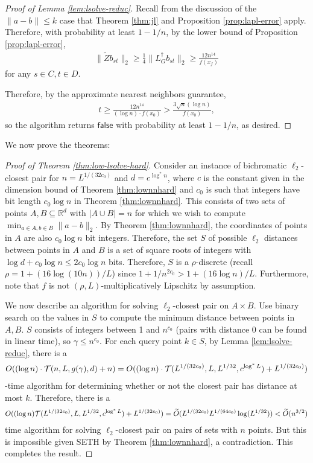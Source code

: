 \begin{proof}[Proof of Lemma \ref{lem:lsolve-reduc}]
Recall from the discussion of the $\|a - b\|\le k$ case that Theorem \ref{thm:jl} and Proposition \ref{prop:lapl-error} apply. Therefore, with probability at least $1 - 1/n$, by the lower bound of Proposition \ref{prop:lapl-error},
\begin{align*}
\|\tilde{Z}b_{st}\|_2 \ge \frac{1}{4} \| L_G^{\dagger} b_{st} \|_2 \ge \frac{12n^{14}}{f(x_f)}
\end{align*}
for any $s\in C,t\in D$. 

Therefore, by the approximate nearest neighbors guarantee, 
\begin{align*}
t \ge \frac{12 n^{14}}{ (\log n) \cdot f(x_0) } > \frac{ 3\sqrt{n} (\log n) }{ f(x_0) },
\end{align*}
so the algorithm returns $\mathsf{false}$ with probability at least $1 - 1/n$, as desired.
\end{proof}

We now prove the theorems:

\begin{proof}[Proof of Theorem \ref{thm:low-lsolve-hard}]
Consider an instance of bichromatic $\ell_2$-closest pair for $n = L^{1/(32c_0)}$ and $d = c^{\log^* n}$, where $c$ is the constant given in the dimension bound of Theorem \ref{thm:lownnhard} and $c_0$ is such that integers have bit length $c_0\log n$ in Theorem \ref{thm:lownnhard}. This consists of two sets of points $A,B\subseteq \mathbb{R}^d$ with $|A\cup B| = n$ for which we wish to compute $\min_{a\in A, b\in B} \|a - b\|_2$. By Theorem \ref{thm:lownnhard}, the coordinates of points in $A$ are also $c_0\log n$ bit integers. Therefore, the set $S$ of possible $\ell_2$ distances between points in $A$ and $B$ is a set of square roots of integers with $\log d + c_0\log n\le 2c_0\log n$ bits. Therefore, $S$ is a $\rho$-discrete (recall $\rho = 1 + (16\log (10n))/L$) since $1 + 1/n^{2c_0} > 1 + (16\log n)/L$. Furthermore, note that $f$ is not $(\rho,L)$-multiplicatively Lipschitz by assumption.

We now describe an algorithm for solving $\ell_2$-closest pair on $A\times B$. Use binary search on the values in $S$ to compute the minimum distance between points in $A,B$. $S$ consists of integers between 1 and $n^{c_0}$ (pairs with distance 0 can be found in linear time), so $\gamma \le n^{c_0}$. For each query point $k\in S$, by Lemma \ref{lem:lsolve-reduc}, there is a 
\begin{align*}
O((\log n)\cdot \mathcal{T}(n,L,g(\gamma),d) + n) = O((\log n) \cdot \mathcal{T}(L^{1/(32c_0)},L,L^{1/32},c^{\log^* L}) + L^{1/(32c_0)})
\end{align*}
-time algorithm for determining whether or not the closest pair has distance at most $k$. Therefore, there is a 
\begin{align*}
O((\log n) \mathcal{T}(L^{1/(32c_0)},L,L^{1/32},c^{\log^* L}) + L^{1/(32c_0)}) = \widetilde{O}(L^{1/(32c_0)}L^{1/(64c_0)} \log(L^{1/32})) < \widetilde{O}(n^{3/2})
\end{align*}
time algorithm for solving $\ell_2$-closest pair on pairs of sets with $n$ points. But this is impossible given {\sf SETH} by Theorem \ref{thm:lownnhard}, a contradiction. This completes the result.
\end{proof}


